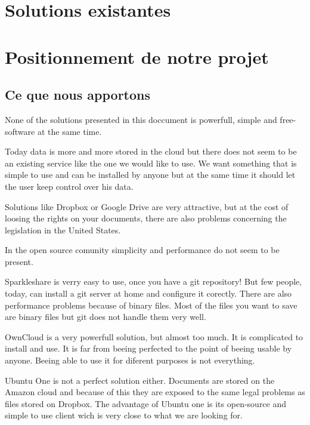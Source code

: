 \documentclass[12pt]{report}
\begin{document}
\thispagestyle{EIP} %

\chapter{Solutions existantes}










\chapter{Positionnement de notre projet}
\thispagestyle{EIP}
\section{Ce que nous apportons}
None of the solutions presented in this doccument is powerfull, simple and free-software at the same time.

Today data is more and more stored in the cloud but there does not seem to be an existing service like the one we would like to use. We want something that is simple to use and can be installed by anyone but at the same time it should let the user keep control over his data.

Solutions like Dropbox or Google Drive are very attractive, but at the cost of loosing the rights on your documents, there are also problems concerning the legislation in the United States.

In the open source comunity simplicity and performance do not seem to be present.

Sparkleshare is verry easy to use, once you have a git repository! But few people, today, can install a git server at home and configure it corectly. There are also performance problems because of binary files. Most of the files you want to save are binary files but git does not handle them very well.

OwnCloud is a very powerfull solution, but almost too much. It is complicated to install and use. It is far from beeing perfected to the point of beeing usable by anyone. Beeing able to use it for diferent purposes is not everything.

Ubuntu One is not a perfect solution either. Documents are stored on the Amazon cloud and because of this they are exposed to the same legal problems as files stored on Dropbox. The advantage of Ubuntu one is its open-source and simple to use client wich is very close to what we are looking for.
\end{document}
